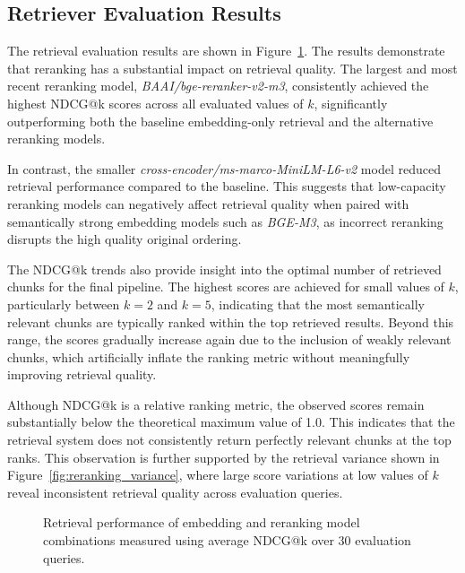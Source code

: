 \documentclass[fleqn,moreauthors,10pt]{ds_report}
\begin{document}
\subsection*{Retriever Evaluation Results}

The retrieval evaluation results are shown in Figure~\ref{fig:reranking_means}. The results demonstrate that reranking has a substantial impact on retrieval quality. The largest and most recent reranking model, \textit{BAAI/bge-reranker-v2-m3}, consistently achieved the highest NDCG@k scores across all evaluated values of $k$, significantly outperforming both the baseline embedding-only retrieval and the alternative reranking models.

In contrast, the smaller \textit{cross-encoder/ms-marco-MiniLM-L6-v2} model reduced retrieval performance compared to the baseline. This suggests that low-capacity reranking models can negatively affect retrieval quality when paired with semantically strong embedding models such as \textit{BGE-M3}, as incorrect reranking disrupts the high quality original ordering.

The NDCG@k trends also provide insight into the optimal number of retrieved chunks for the final pipeline. The highest scores are achieved for small values of $k$, particularly between $k=2$ and $k=5$, indicating that the most semantically relevant chunks are typically ranked within the top retrieved results. Beyond this range, the scores gradually increase again due to the inclusion of weakly relevant chunks, which artificially inflate the ranking metric without meaningfully improving retrieval quality.

Although NDCG@k is a relative ranking metric, the observed scores remain substantially below the theoretical maximum value of 1.0. This indicates that the retrieval system does not consistently return perfectly relevant chunks at the top ranks. This observation is further supported by the retrieval variance shown in Figure~\ref{fig:reranking_variance}, where large score variations at low values of $k$ reveal inconsistent retrieval quality across evaluation queries.

\begin{figure}[H]
  \centering
  
  \caption{
    Retrieval performance of embedding and reranking model combinations measured using average NDCG@k over 30 evaluation queries.
  }
  \label{fig:reranking_means}
\end{figure}
\end{document}
